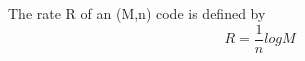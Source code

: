\documentclass[preview]{standalone}
\begin{document}
\begin{center}
The rate R of an (M,n) code is defined by \[R = \frac{1}{n} logM\]
\end{center}
\end{document}
